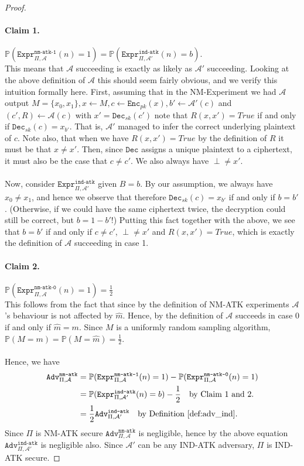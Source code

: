 \documentclass{article}
\theoremstyle{definition}
\theoremstyle{example}
\newcommand{\Enc}{\texttt{Enc}}
\newcommand{\Dec}{\texttt{Dec}}
\newcommand{\A}{\mathcal{A}}
\newcommand{\Prob}{\mathbb{P}}
\newcommand{\Expr}[2]{\texttt{Expr}^{\texttt{#1}}_{#2}}
\newcommand{\Adv}[2]{\texttt{Adv}^{\texttt{#1}}_{#2}}
\begin{document}
\begin{proof}
  \paragraph{Claim 1.} $\Prob(\Expr{nm-atk-1}{\Pi, \A}(n) = 1) = \Prob(\Expr{ind-atk}{\Pi, \A'}(n) = b)$.\\
  This means that $\A$ succeeding is exactly as likely as $\A'$ succeeding.
  Looking at the above definition of $\A$ this should seem fairly obvious, and
  we verify this intuition formally here. First, assuming that in the
  NM-Experiment we had $\A$ output $M = \{x_0, x_1\}, x \leftarrow M, c
  \leftarrow \Enc_{pk}(x), b' \leftarrow \A'(c)$ and $(c', R) \leftarrow \A(c)$
  with $x' = \Dec_{sk}(c')$ note that
  $R(x, x') = True$ if and only if $\Dec_{sk}(c) = x_{b'}$. That is, $\A'$
  managed to infer the correct underlying plaintext of $c$. Note also, that when
  we have $R(x, x') = True$ by the definition of $R$ it must be that $x \neq
  x'$. Then, since $\Dec$ assigns a unique plaintext to a ciphertext, it must
  also be the case that $c \neq c'$. We also always have $\perp \neq x'$.
  \paragraph{} Now, consider $\Expr{ind-atk}{\Pi, \A'}$ given $B = b$. By our assumption, we
  always have $x_0 \neq x_1$, and hence we observe that therefore $\Dec_{sk}(c) =
  x_{b'}$ if and only if $b = b'$. (Otherwise, if we could have the same
  ciphertext twice, the decryption could still be correct, but $b = 1 - b'$!)
  Putting this fact together with the above, we see that $b = b'$ if and only if
  $c \neq c'$, $\perp \neq x'$ and $R(x, x') = True$, which is exactly the
  definition of $\A$ succeeding in case 1.
  \paragraph{Claim 2.} $\Prob(\Expr{nm-atk-0}{\Pi, \A}(n) = 1) = \frac12$\\
  This follows from the fact that since by the definition of NM-ATK experiments
  $\A$'s behaviour is not affected by $\hat{m}$. Hence, by the definition of
  $\A$ succeeds in case 0 if and only if $\hat{m} = m$. Since $M$ is a uniformly random
  sampling algorithm, $\Prob(M = m) = \Prob(M = \hat{m}) = \frac12$.
  \paragraph{}
  Hence, we have 
  \begin{align*}
    \Adv{nm-atk}{\Pi, \A} &= \Prob(\Expr{nm-atk-1}{\Pi, \A}(n) = 1) - \Prob(\Expr{nm-atk-0}{\Pi, \A}(n) = 1)\\
                          &= \Prob(\Expr{ind-atk}{\Pi, \A'}(n) = b) - \frac12 \quad\text{by Claim 1 and 2.}\\
                          &= \frac12 \Adv{ind-atk}{\Pi, \A'}\quad\text{by Definition \ref{def:adv_ind}}.
  \end{align*}
  Since $\Pi$ is NM-ATK secure $\Adv{nm-atk}{\Pi, \A}$ is negligible, hence by
  the above equation $\Adv{ind-atk}{\Pi, \A'}$ is negligible also. Since $\A'$ can
  be any IND-ATK adversary, $\Pi$ is IND-ATK secure.
\end{proof}
\end{document}
